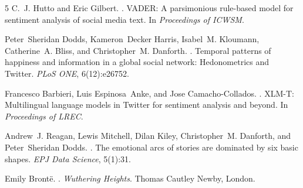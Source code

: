 \documentclass[11pt,a4paper]{article}
\begin{document}

\begin{thebibliography}{5}
C.~J. Hutto and Eric Gilbert.
.
\newblock VADER: A parsimonious rule-based model for sentiment analysis of social media text.
\newblock In \emph{Proceedings of ICWSM}.

Peter~Sheridan Dodds, Kameron~Decker Harris, Isabel~M. Kloumann, Catherine~A. Bliss, and Christopher~M. Danforth.
.
\newblock Temporal patterns of happiness and information in a global social network: Hedonometrics and Twitter.
\newblock \emph{PLoS ONE}, 6(12):e26752.

Francesco Barbieri, Luis Espinosa~Anke, and Jose Camacho-Collados.
.
\newblock XLM-T: Multilingual language models in Twitter for sentiment analysis and beyond.
\newblock In \emph{Proceedings of LREC}.

Andrew~J. Reagan, Lewis Mitchell, Dilan Kiley, Christopher~M. Danforth, and Peter~Sheridan Dodds.
.
\newblock The emotional arcs of stories are dominated by six basic shapes.
\newblock \emph{EPJ Data Science}, 5(1):31.

Emily Bront\"{e}.
.
\newblock \emph{Wuthering Heights}.
\newblock Thomas Cautley Newby, London.
\end{thebibliography}
\end{document}
